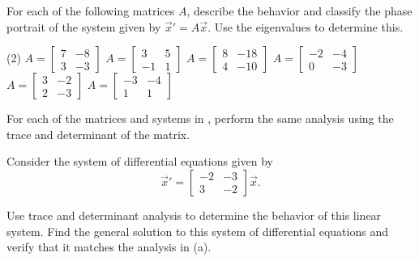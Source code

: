 \documentclass{ximera}
\begin{document}
\begin{exercise}\label{ex:TwoDimSys1}%
    For each of the following matrices $A$, describe the behavior and classify the phase portrait of the system given by ${\vec{x}}' = A\vec{x}$. Use the eigenvalues to determine this.
    \begin{tasks}(2)
        \task $A = \begin{bmatrix} 7 & -8 \\ 3 & -3 \end{bmatrix}$
        \task $A = \begin{bmatrix} 3 & 5 \\ -1 & 1 \end{bmatrix}$
        \task $A = \begin{bmatrix} 8 & -18 \\ 4 & -10 \end{bmatrix}$
        \task $A = \begin{bmatrix} -2 & -4 \\0 & -3 \end{bmatrix}$
        \task $A = \begin{bmatrix} 3 & -2 \\ 2 & -3 \end{bmatrix}$
        \task $A = \begin{bmatrix} -3 & -4 \\ 1 & 1 \end{bmatrix}$
    \end{tasks}
\end{exercise}

\begin{exercise}
For each of the matrices and systems in , perform the same analysis using the trace and determinant of the matrix.
\end{exercise}

\begin{exercise}
    Consider the system of differential equations given by 
    \begin{equation*}
        {\vec{x}}'  = \begin{bmatrix} -2 & -3 \\ 3 & -2 \end{bmatrix} \vec{x}.
    \end{equation*}
    \begin{tasks}
        \task Use trace and determinant analysis to determine the behavior of this linear system.
        \task Find the general solution to this system of differential equations and verify that it matches the analysis in (a).
    \end{tasks}
\end{exercise}
\end{document}
